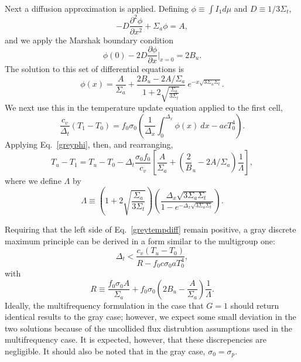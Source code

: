 Next a diffusion approximation is applied.  Defining $\phi\equiv\int I_1d\mu$
and
$D\equiv1/3\Sigma_t$,
\begin{equation}
-D\frac{\partial^2\phi}{\partial x^2} + \Sigma_a\phi=A,
\end{equation}
and we apply the Marshak boundary condition
\[\phi(0)-2D\frac{\partial\phi}{\partial x}\bigg|_{x=0}=2B_u.\]
The solution to this set of differential equations is
\begin{equation}
\phi(x)=\frac{A}{\Sigma_a} + \frac{2B_u-2A/\Sigma_a}{1+
  2\sqrt{\frac{\Sigma_a}{3\Sigma_t}}}\
    e^{-x\sqrt{3\Sigma_a\Sigma_t}}.\label{greyphi}
\end{equation}
We next use this in the temperature update equation applied to the first cell,
\[\frac{c_v}{\Delta_t}(T_1-T_0)=f_0\sigma_0
  \left(\frac{1}{\Delta_x}\int_0^{\Delta_x}\phi(x)\ dx - acT_0^4\right).\]
Applying Eq.\ \eqref{greyphi}, then, and rearranging,
\begin{equation}\label{greytempdiff}
T_u-T_1=T_u-T_0-\Delta_t\frac{\sigma_0f_0}{c_v}
  \left[\frac{A}{\Sigma_a} + \left(\frac2B_u-2A/\Sigma_a\right)\frac{1}{\Lambda}
\right],
\end{equation}
where we define $\Lambda$ by
\[\Lambda\equiv \left(1+2\sqrt{\frac{\Sigma_a}{3\Sigma_t}}\right)
  \left(\frac{\Delta_x\sqrt{3\Sigma_a\Sigma_t}}
    {1-e^{-\Delta_x\sqrt{3\Sigma_a\Sigma_t}}}\right).\]

Requiring that the left side of Eq.\ \eqref{greytempdiff} remain positive, a
gray
discrete maximum principle can be derived in a form similar to the multigroup one:
\begin{equation}
\Delta_t<\frac{c_v(T_u-T_0)}{R-f_0c\sigma_0aT_0^4},
\end{equation}
with
\[R\equiv\frac{f_0\sigma_0A}{\Sigma_a} + 
  f_0\sigma_0\left(2B_u-\frac{A}{\Sigma_a}\right)\frac{1}{\Lambda}.\]
Ideally, the multifrequency formulation in the case that $G=1$ should return
identical results to the gray case; however, we expect some small deviation in
the two solutions because of the uncollided flux distrubtion assumptions used
in the multifrequency case.  It is expected, however, that these discrepencies
are negligible.
It should also be noted that in the gray case, $\sigma_0=\sigma_p$.

